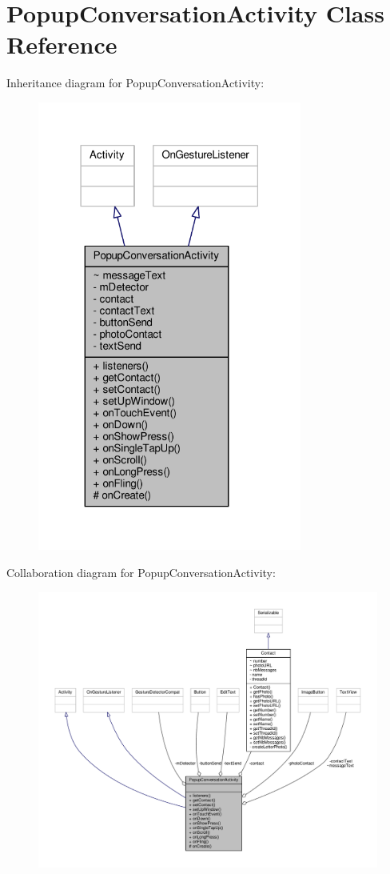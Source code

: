 \hypertarget{a00013}{\section{Popup\+Conversation\+Activity Class Reference}
\label{a00013}
}


Inheritance diagram for Popup\+Conversation\+Activity\+:
\nopagebreak
\begin{figure}[H]
\begin{center}
\leavevmode
\includegraphics[width=246pt]{a00084}
\end{center}
\end{figure}


Collaboration diagram for Popup\+Conversation\+Activity\+:
\nopagebreak
\begin{figure}[H]
\begin{center}
\leavevmode
\includegraphics[width=350pt]{a00085}
\end{center}
\end{figure}
